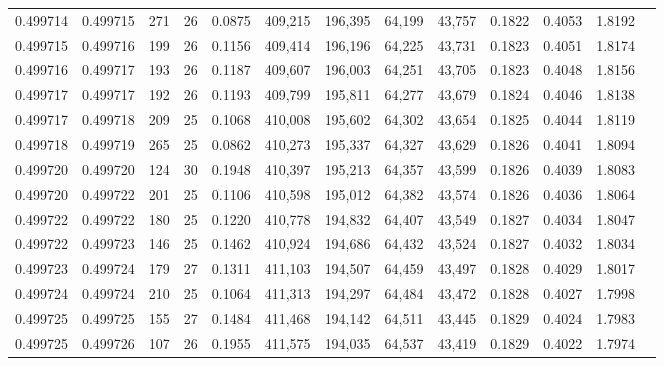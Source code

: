 \begin{tabular}{rrrrrrrrrrrrr}
0.499714 & 0.499715 & 271 &  26 &                                     0.0875 & 409,215 & 196,395 &  64,199 &  43,757 & 0.1822 & 0.4053 & 1.8192 \\
0.499715 & 0.499716 & 199 &  26 &                                     0.1156 & 409,414 & 196,196 &  64,225 &  43,731 & 0.1823 & 0.4051 & 1.8174 \\
0.499716 & 0.499717 & 193 &  26 &                                     0.1187 & 409,607 & 196,003 &  64,251 &  43,705 & 0.1823 & 0.4048 & 1.8156 \\
0.499717 & 0.499717 & 192 &  26 &                                     0.1193 & 409,799 & 195,811 &  64,277 &  43,679 & 0.1824 & 0.4046 & 1.8138 \\
0.499717 & 0.499718 & 209 &  25 &                                     0.1068 & 410,008 & 195,602 &  64,302 &  43,654 & 0.1825 & 0.4044 & 1.8119 \\
0.499718 & 0.499719 & 265 &  25 &                                     0.0862 & 410,273 & 195,337 &  64,327 &  43,629 & 0.1826 & 0.4041 & 1.8094 \\
0.499720 & 0.499720 & 124 &  30 &                                     0.1948 & 410,397 & 195,213 &  64,357 &  43,599 & 0.1826 & 0.4039 & 1.8083 \\
0.499720 & 0.499722 & 201 &  25 &                                     0.1106 & 410,598 & 195,012 &  64,382 &  43,574 & 0.1826 & 0.4036 & 1.8064 \\
0.499722 & 0.499722 & 180 &  25 &                                     0.1220 & 410,778 & 194,832 &  64,407 &  43,549 & 0.1827 & 0.4034 & 1.8047 \\
0.499722 & 0.499723 & 146 &  25 &                                     0.1462 & 410,924 & 194,686 &  64,432 &  43,524 & 0.1827 & 0.4032 & 1.8034 \\
0.499723 & 0.499724 & 179 &  27 &                                     0.1311 & 411,103 & 194,507 &  64,459 &  43,497 & 0.1828 & 0.4029 & 1.8017 \\
0.499724 & 0.499724 & 210 &  25 &                                     0.1064 & 411,313 & 194,297 &  64,484 &  43,472 & 0.1828 & 0.4027 & 1.7998 \\
0.499725 & 0.499725 & 155 &  27 &                                     0.1484 & 411,468 & 194,142 &  64,511 &  43,445 & 0.1829 & 0.4024 & 1.7983 \\
0.499725 & 0.499726 & 107 &  26 &                                     0.1955 & 411,575 & 194,035 &  64,537 &  43,419 & 0.1829 & 0.4022 & 1.7974 \\

\end{tabular}
